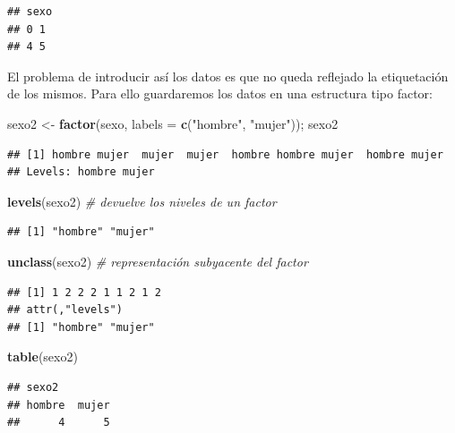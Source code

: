 \documentclass[]{book}
\newenvironment{Shaded}{\begin{snugshade}}{\end{snugshade}}
\newcommand{\KeywordTok}[1]{\textcolor[rgb]{0.13,0.29,0.53}{\textbf{#1}}}
\newcommand{\DataTypeTok}[1]{\textcolor[rgb]{0.13,0.29,0.53}{#1}}
\newcommand{\StringTok}[1]{\textcolor[rgb]{0.31,0.60,0.02}{#1}}
\newcommand{\CommentTok}[1]{\textcolor[rgb]{0.56,0.35,0.01}{\textit{#1}}}
\newcommand{\NormalTok}[1]{#1}
\begin{document}
\begin{verbatim}
## sexo
## 0 1 
## 4 5
\end{verbatim}

El problema de introducir así los datos es que no queda reflejado la
etiquetación de los mismos. Para ello guardaremos los datos en una
estructura tipo factor:

\begin{Shaded}
\begin{Highlighting}[]
\NormalTok{sexo2 <-}\StringTok{ }\KeywordTok{factor}\NormalTok{(sexo, }\DataTypeTok{labels =} \KeywordTok{c}\NormalTok{(}\StringTok{"hombre"}\NormalTok{, }\StringTok{"mujer"}\NormalTok{)); sexo2}
\end{Highlighting}
\end{Shaded}

\begin{verbatim}
## [1] hombre mujer  mujer  mujer  hombre hombre mujer  hombre mujer 
## Levels: hombre mujer
\end{verbatim}

\begin{Shaded}
\begin{Highlighting}[]
\KeywordTok{levels}\NormalTok{(sexo2)  }\CommentTok{# devuelve los niveles de un factor}
\end{Highlighting}
\end{Shaded}

\begin{verbatim}
## [1] "hombre" "mujer"
\end{verbatim}

\begin{Shaded}
\begin{Highlighting}[]
\KeywordTok{unclass}\NormalTok{(sexo2)  }\CommentTok{# representación subyacente del factor}
\end{Highlighting}
\end{Shaded}

\begin{verbatim}
## [1] 1 2 2 2 1 1 2 1 2
## attr(,"levels")
## [1] "hombre" "mujer"
\end{verbatim}

\begin{Shaded}
\begin{Highlighting}[]
\KeywordTok{table}\NormalTok{(sexo2)}
\end{Highlighting}
\end{Shaded}

\begin{verbatim}
## sexo2
## hombre  mujer 
##      4      5
\end{verbatim}
\end{document}
